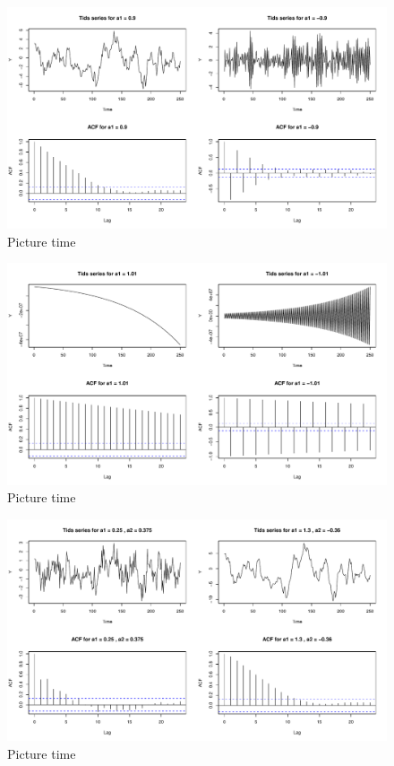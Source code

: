 \begin{figure}
    \centering
    \includegraphics[width=140mm]{ar1-filter-2.pdf}
    \caption{Picture time}
    \label{fig:one}
\end{figure}

\begin{figure}
    \centering
    \includegraphics[width=140mm]{ar1-filter-3.pdf}
    \caption{Picture time}
    \label{fig:one}
\end{figure}


\begin{figure}
    \centering
    \includegraphics[width=140mm]{ar2-filter-1.pdf}
    \caption{Picture time}
    \label{fig:one}
\end{figure}


